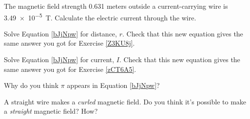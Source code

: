 \documentclass{article}
\begin{document}
\begin{exercise} \label{zCT6A5}
    The magnetic field strength 0.631 meters outside a current-carrying wire is \SI{3.49e-5}{T}. Calculate the electric current through the wire.
\end{exercise}

\begin{exercise}
    Solve Equation \ref{bJjNpw} for distance, $r$. Check that this new equation gives the same answer you got for Exercise \ref{Z3KU8j}. 
\end{exercise}

\begin{exercise}
    Solve Equation \ref{bJjNpw} for current, $I$. Check that this new equation gives the same answer you got for Exercise \ref{zCT6A5}. 
\end{exercise}

\begin{exercise}
    Why do you think $\pi$ appears in Equation \ref{bJjNpw}?
\end{exercise}

\begin{exercise}
A straight wire makes a \textit{curled} magnetic field. Do you think it's possible to make a \textit{straight} magnetic field? How?
\end{exercise}







\end{document}
